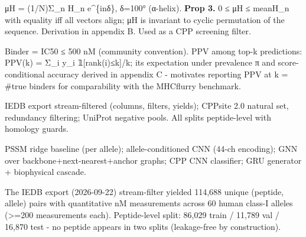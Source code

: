 μH = (1/N)\textbar Σ\_n H\_n e\^{}\{inδ\}\textbar, δ=100° (α-helix). \textbf{Prop 3.} 0 ≤ μH ≤ mean\textbar H\_n\textbar{} with equality iff all vectors align; μH is invariant to cyclic permutation of the sequence. Derivation in appendix B. Used as a CPP screening filter.


Binder = IC50 ≤ 500 nM (community convention). PPV among top-k predictions: PPV(k) = Σ\_i y\_i 𝟙{[}rank(i)≤k{]}/k; its expectation under prevalence π and score-conditional accuracy derived in appendix C - motivates reporting PPV at k = \#true binders for comparability with the MHCflurry benchmark.


IEDB export stream-filtered (columns, filters, yields); CPPsite 2.0 natural set, redundancy filtering; UniProt negative pools. All splits peptide-level with homology guards.


PSSM ridge baseline (per allele); allele-conditioned CNN (44-ch encoding); GNN over backbone+next-nearest+anchor graphs; CPP CNN classifier; GRU generator + biophysical cascade.



The IEDB export (2026-09-22) stream-filter yielded 114,688 unique (peptide, allele) pairs with quantitative nM measurements across 60 human class-I alleles (\textgreater=200 measurements each). Peptide-level split: 86,029 train / 11,789 val / 16,870 test - no peptide appears in two splits (leakage-free by construction).

